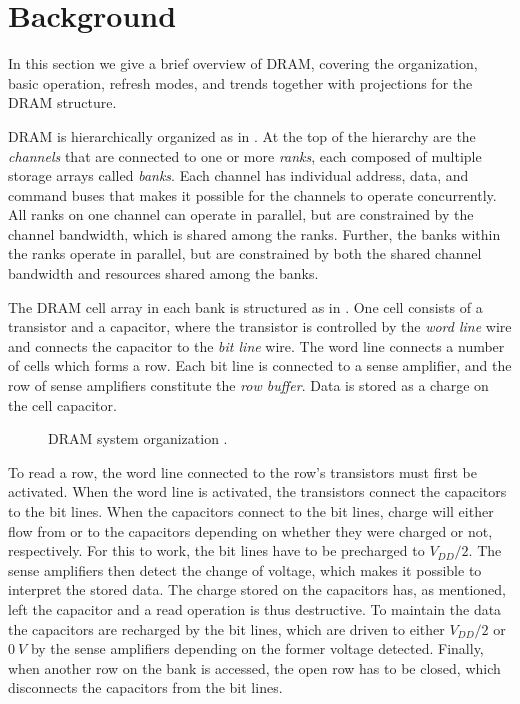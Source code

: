 \section{Background} 
\label{sec:bg}
In this section we give a brief overview of DRAM, covering the organization, basic operation, refresh modes, and trends together with projections for the DRAM structure.

DRAM is hierarchically organized as in . At the top of the hierarchy are the \textit{channels} that are connected to one or more \textit{ranks}, each composed of multiple storage arrays called \textit{banks}. Each channel has individual address, data, and command buses that makes it possible for the channels to operate concurrently. All ranks on one channel can operate in parallel, but are constrained by the channel bandwidth, which is shared among the ranks. Further, the banks within the ranks operate in parallel, but are constrained by both the shared channel bandwidth and resources shared among the banks. 

The DRAM cell array in each bank is structured as in . One cell consists of a transistor and a capacitor, where the transistor is controlled by the \textit{word line} wire and connects the capacitor to the \textit{bit line} wire. The word line connects a number of cells which forms a row. Each bit line is connected to a sense amplifier, and the row of sense amplifiers constitute the \textit{row buffer}. Data is stored as a charge on the cell capacitor.

\begin{figure*}[t]
    \centering
	\caption{DRAM system organization \cite{raidr}.}
	\label{fig:dram_org}
\end{figure*}

To read a row, the word line connected to the row's transistors must first be activated. When the word line is activated, the transistors connect the capacitors to the bit lines. When the capacitors connect to the bit lines, charge will either flow from or to the capacitors depending on whether they were charged or not, respectively. For this to work, the bit lines have to be precharged to $V_{DD}/2$. The sense amplifiers then detect the change of voltage, which makes it possible to interpret the stored data. The charge stored on the capacitors has, as mentioned, left the capacitor and a read operation is thus destructive. To maintain the data the capacitors are recharged by the bit lines, which are driven to either $V_{DD}/2$ or $0\:V$ by the sense amplifiers depending on the former voltage detected. Finally, when another row on the bank is accessed, the open row has to be closed, which disconnects the capacitors from the bit lines.

